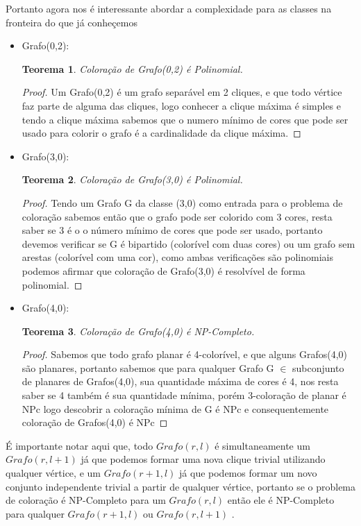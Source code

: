 \documentclass[a4paper,oneside,12pt]{book}
\newtheorem{teorema}{Teorema}
\begin{document}
Portanto agora nos é interessante abordar a complexidade para as classes na fronteira do que já conheçemos
\begin{itemize}
  \item Grafo(0,2):
     \begin{teorema}
        Coloração de Grafo(0,2) é Polinomial.
     \end{teorema}
     \begin{proof}
      Um Grafo(0,2) é um grafo separável em 2 cliques, e que todo vértice faz parte de alguma das cliques, logo conhecer a clique máxima é simples e tendo a clique máxima sabemos que o numero mínimo de cores que pode ser usado para colorir o grafo é a cardinalidade da clique máxima.
     \end{proof}
  \item Grafo(3,0):
     \begin{teorema}
        Coloração de Grafo(3,0) é Polinomial.
     \end{teorema}
     \begin{proof}
      Tendo um Grafo G da classe (3,0) como entrada para o problema de coloração sabemos então que o grafo pode ser colorido com 3 cores, resta saber se 3 é o o número mínimo de cores que pode ser usado, portanto devemos verificar se G é bipartido (colorível com duas cores) ou um grafo sem arestas (colorível com uma cor), como ambas verificações são polinomiais podemos afirmar que coloração de Grafo(3,0) é resolvível de forma polinomial.
     \end{proof}
  \item Grafo(4,0):
      \begin{teorema}
        Coloração de Grafo(4,0) é NP-Completo.
      \end{teorema}
      \begin{proof}
        Sabemos que todo grafo planar é 4-colorível, e que alguns Grafos(4,0) são planares, portanto sabemos que para qualquer Grafo G $\in$ subconjunto de planares de Grafos(4,0), sua quantidade máxima de cores é 4, nos resta saber se 4 também é sua quantidade mínima, porém 3-coloração de planar é NPc logo descobrir a coloração mínima de G é NPc e consequentemente coloração de Grafos(4,0) é NPc
      \end{proof}
\end{itemize}

É importante notar aqui que, todo $Grafo(r,l)$ é simultaneamente um $Grafo(r,l+1)$ já que podemos formar uma nova clique trivial utilizando qualquer vértice, e um $Grafo(r+1,l)$ já que podemos formar um novo conjunto independente trivial a partir de qualquer vértice, portanto se o problema de coloração é NP-Completo para um $Grafo(r,l)$ então ele é NP-Completo para qualquer $Grafo(r+1,l)$ ou $Grafo(r,l+1)$ .
\end{document}
